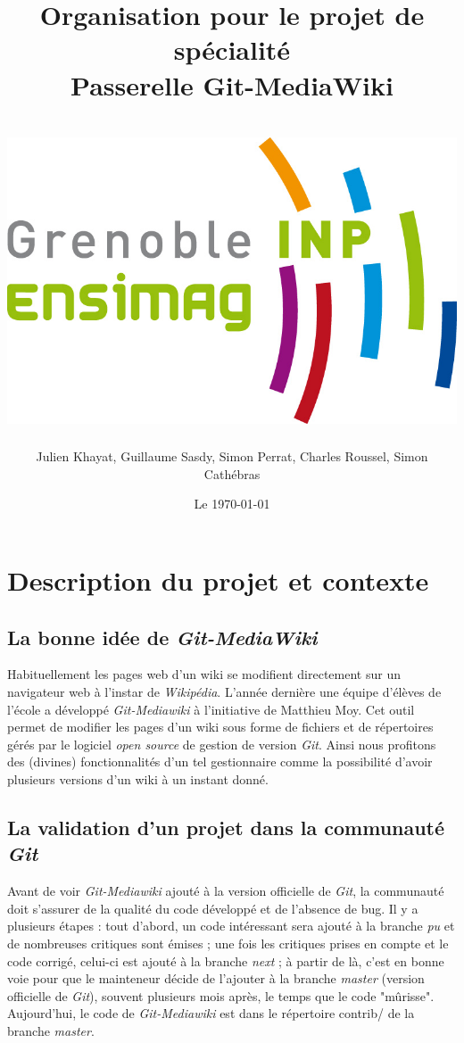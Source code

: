 \documentclass[11pt]{article}
\title{Organisation pour le projet de spécialité\\
Passerelle Git-MediaWiki\\
~\\
\includegraphics[scale=0.75]{logo_ensimag.jpg} 
}
\author{Julien Khayat, Guillaume Sasdy, Simon Perrat, Charles Roussel, Simon Cathébras}
\date{Le \today}
\begin{document}
\maketitle

\section{Description du projet et contexte}
\subsection{La bonne idée de \textit{Git-MediaWiki}}
Habituellement les pages web d'un wiki se modifient directement sur un navigateur web à l'instar de \textit{Wikipédia}. L'année dernière une équipe d'élèves de l'école a développé \textit{Git-Mediawiki} à l'initiative de Matthieu Moy. Cet outil permet de modifier les pages d'un wiki sous forme de fichiers et de répertoires gérés par le logiciel \textit{open source} de gestion de version \textit{Git}. Ainsi nous profitons des (divines) fonctionnalités d'un tel gestionnaire comme la possibilité d'avoir plusieurs versions d'un wiki à un instant donné.\\
\subsection{La validation d'un projet dans la communauté \textit{Git}}
Avant de voir \textit{Git-Mediawiki} ajouté à la version officielle de \textit{Git}, la communauté doit s'assurer de la qualité du code développé et de l'absence de bug. Il y a plusieurs étapes : tout d'abord, un code intéressant sera ajouté à la branche \textit{pu} et de nombreuses critiques sont émises ; une fois les critiques prises en compte et le code corrigé, celui-ci est ajouté à la branche \textit{next} ; à partir de là, c'est en bonne voie pour que le mainteneur décide de l'ajouter à la branche \textit{master} (version officielle de \textit{Git}), souvent plusieurs mois après, le temps que le code "mûrisse". Aujourd'hui, le code de \textit{Git-Mediawiki} est dans le répertoire contrib/ de la branche \textit{master}.\\
\end{document}
